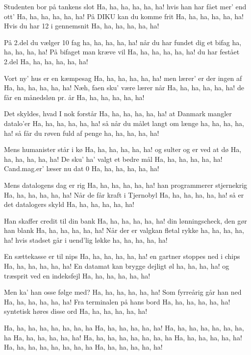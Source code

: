\documentclass[a4paper,11pt]{article}
\begin{document}
\begin{song}
Studenten bor på tankens slot
Ha, ha, ha, ha, ha, ha!
hvis han har fået mer' end ott'
Ha, ha, ha, ha, ha, ha!
På DIKU kan du komme frit
Ha, ha, ha, ha, ha, ha!
Hvis du har 12 i gennemsnit
Ha, ha, ha, ha, ha, ha!

På 2.del du vælger 10 fag
ha, ha, ha, ha, ha!
når du har fundet dig et bifag
ha, ha, ha, ha, ha!
På bifaget man kræve vil
Ha, ha, ha, ha, ha, ha!
du har festået 2.del
Ha, ha, ha, ha, ha, ha!

Vort ny' hus er en kæmpesag
Ha, ha, ha, ha, ha, ha!
men lærer' er der ingen af
Ha, ha, ha, ha, ha, ha!
Næh, faen sku' være lærer når
Ha, ha, ha, ha, ha, ha!
de får en månedsløn pr. år
Ha, ha, ha, ha, ha, ha!

Det skyldes, hvad I nok forstår
Ha, ha, ha, ha, ha, ha!
at Danmark mangler datalo'er
Ha, ha, ha, ha, ha, ha!
så når du målet langt om længe
ha, ha, ha, ha, ha!
så får du røven fuld af penge
ha, ha, ha, ha, ha!

Mens humanister står i kø
Ha, ha, ha, ha, ha, ha!
og sulter og er ved at dø
Ha, ha, ha, ha, ha, ha!
De sku' ha' valgt et bedre mål
Ha, ha, ha, ha, ha, ha!
Cand.mag.er' læser nu dat 0
Ha, ha, ha, ha, ha, ha!

Mens datalogens dag er rig
Ha, ha, ha, ha, ha, ha!
han programmerer stjernekrig
Ha, ha, ha, ha, ha, ha!
Når de får kraft i Tjernobyl
Ha, ha, ha, ha, ha, ha!
så er det datalogers skyld
Ha, ha, ha, ha, ha, ha!

Han skaffer credit til din bank
Ha, ha, ha, ha, ha, ha!
din lønningscheck, den gør han blank
Ha, ha, ha, ha, ha, ha!
Når der er valgkan fletal rykke
ha, ha, ha, ha, ha!
hvis stadset går i uend'lig løkke
ha, ha, ha, ha, ha!

En sættekasse er til nips
Ha, ha, ha, ha, ha, ha!
en gartner stoppes ned i chips
Ha, ha, ha, ha, ha, ha!
En datamat kan brygge dejligt øl
ha, ha, ha, ha!
og træsprit ved en indeksfejl
Ha, ha, ha, ha, ha, ha!

Men ka' han osse følge med?
Ha, ha, ha, ha, ha, ha!
Som fyrreårig går han ned
Ha, ha, ha, ha, ha, ha!
Fra terminalen på hans bord
Ha, ha, ha, ha, ha, ha!
syntetisk høres disse ord
 Ha, ha, ha, ha, ha, ha!

Ha, ha, ha, ha, ha, ha, ha, ha
Ha, ha, ha, ha, ha, ha!
Ha, ha, ha, ha, ha, ha, ha, ha
Ha, ha, ha, ha, ha, ha!
Ha, ha, ha, ha, ha, ha, ha, ha
Ha, ha, ha, ha, ha, ha!
Ha, ha, ha, ha, ha, ha, ha, ha
Ha, ha, ha, ha, ha, ha!
\end{song}
\end{document}
